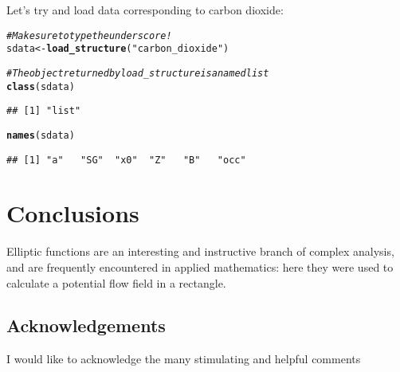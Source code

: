 \documentclass[12pt,a4paper]{article}\usepackage[]{graphicx}\usepackage[]{color}
\makeatletter
\newcommand{\hlstr}[1]{\textcolor[rgb]{0.192,0.494,0.8}{#1}}%
\newcommand{\hlcom}[1]{\textcolor[rgb]{0.678,0.584,0.686}{\textit{#1}}}%
\newcommand{\hlstd}[1]{\textcolor[rgb]{0.345,0.345,0.345}{#1}}%
\newcommand{\hlkwb}[1]{\textcolor[rgb]{0.69,0.353,0.396}{#1}}%
\newcommand{\hlkwd}[1]{\textcolor[rgb]{0.737,0.353,0.396}{\textbf{#1}}}%
\newenvironment{kframe}{%
 \def\at@end@of@kframe{}%
 \ifinner\ifhmode%
  \def\at@end@of@kframe{\end{minipage}}%
  \begin{minipage}{\columnwidth}%
 \fi\fi%
 \def\FrameCommand##1{\hskip\@totalleftmargin \hskip-\fboxsep
 \colorbox{shadecolor}{##1}\hskip-\fboxsep
     \hskip-\linewidth \hskip-\@totalleftmargin \hskip\columnwidth}%
 \MakeFramed {\advance\hsize-\width
   \@totalleftmargin\z@ \linewidth\hsize
   \@setminipage}}%
 {\par\unskip\endMakeFramed%
 \at@end@of@kframe}
\newenvironment{knitrout}{}{} %
\makeatother
\begin{document}
Let's try and load data corresponding to carbon dioxide:

\begin{knitrout}
\color{fgcolor}\begin{kframe}
\begin{alltt}
\hlcom{# Make sure to type the underscore!}
\hlstd{sdata} \hlkwb{<-} \hlkwd{load_structure}\hlstd{(}\hlstr{"carbon_dioxide"}\hlstd{)}

\hlcom{# The object returned by load_structure is a named list}
\hlkwd{class}\hlstd{(sdata)}
\end{alltt}
\begin{verbatim}
## [1] "list"
\end{verbatim}
\begin{alltt}
\hlkwd{names}\hlstd{(sdata)}
\end{alltt}
\begin{verbatim}
## [1] "a"   "SG"  "x0"  "Z"   "B"   "occ"
\end{verbatim}
\end{kframe}
\end{knitrout}

\section{Conclusions}

Elliptic functions are an interesting and instructive branch of
complex analysis, and are frequently encountered in applied
mathematics: here they were used to calculate a potential flow field
in a rectangle.



\subsection*{Acknowledgements}
I would like to acknowledge the many stimulating and helpful comments
%
\end{document}
